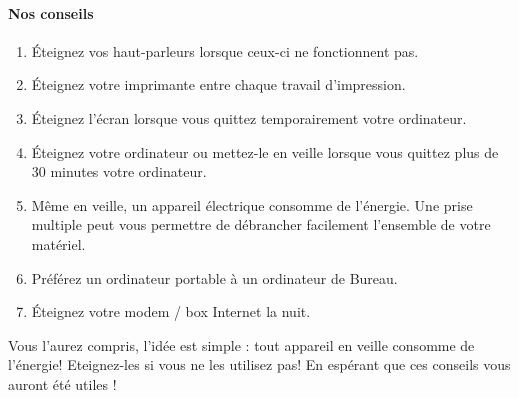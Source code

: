 \documentclass[a4paper,11pt,french]{article}
\begin{document}
\paragraph{Nos conseils}
\begin{enumerate}
\item Éteignez vos haut-parleurs lorsque ceux-ci ne fonctionnent pas.
\item Éteignez votre imprimante entre chaque travail d'impression.
\item Éteignez l'écran lorsque vous quittez temporairement votre ordinateur.
\item Éteignez votre ordinateur ou mettez-le en veille lorsque vous quittez plus de 30 minutes votre ordinateur.
\item Même en veille, un appareil électrique consomme de l'énergie. Une prise multiple peut vous permettre de débrancher facilement l'ensemble de votre matériel.
\item Préférez un ordinateur portable à un ordinateur de Bureau.
\item Éteignez votre modem / box Internet la nuit.
\end{enumerate}

Vous l'aurez compris, l'idée est simple : tout appareil en veille consomme de l'énergie! Eteignez-les si vous ne les utilisez pas!
En espérant que ces conseils vous auront été utiles !
\end{document}
